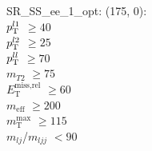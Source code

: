 SR\_SS\_ee\_1\_opt: (175, 0): \\
$p_{\text{T}}^{l1}$ $\geq 40$ \\
$p_{\text{T}}^{l2}$ $\geq 25$ \\
$p_{\text{T}}^{ll}$ $\geq 70$ \\
$m_{T2}$ $\geq 75$ \\
$E_{\text{T}}^{\text{miss,rel}}$ $\geq 60$ \\
$m_{\text{eff}}$ $\geq 200$ \\
$m_{\text{T}}^{\text{max}}$ $\geq 115$ \\
$m_{lj}$/$m_{ljj}$ $<90$ \\
